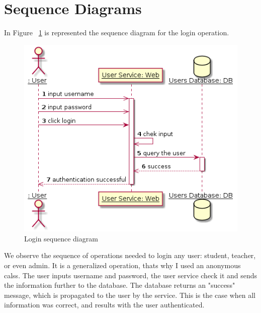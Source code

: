 \documentclass[12pt,a4paper,titlepage]{article}
\begin{document}
\section{Sequence Diagrams}
In Figure ~\ref{fig:login} is represented the sequence diagram for the login operation.
\begin{figure}[H]
	\centering
	\includegraphics[width=\textwidth]{login}
	\caption{Login sequence diagram}
	\label{fig:login}
\end{figure}
We observe the sequence of operations needed to login any user: student, teacher, or even admin. It is a generalized operation, thats why I used an anonymous calss. The user inputs username and password, the user service check it and sends the information further to the database. The database returns an "success" message, which is propagated to the user by the service. This is the case when all information was correct, and results with the user authenticated.\par
\end{document}
